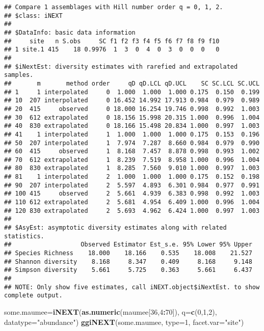 \documentclass[]{article}
\newenvironment{Shaded}{\begin{snugshade}}{\end{snugshade}}
\newcommand{\KeywordTok}[1]{\textcolor[rgb]{0.13,0.29,0.53}{\textbf{#1}}}
\newcommand{\DataTypeTok}[1]{\textcolor[rgb]{0.13,0.29,0.53}{#1}}
\newcommand{\DecValTok}[1]{\textcolor[rgb]{0.00,0.00,0.81}{#1}}
\newcommand{\StringTok}[1]{\textcolor[rgb]{0.31,0.60,0.02}{#1}}
\newcommand{\OperatorTok}[1]{\textcolor[rgb]{0.81,0.36,0.00}{\textbf{#1}}}
\newcommand{\NormalTok}[1]{#1}
\begin{document}
\begin{verbatim}
## Compare 1 assemblages with Hill number order q = 0, 1, 2.
## $class: iNEXT
## 
## $DataInfo: basic data information
##     site   n S.obs     SC f1 f2 f3 f4 f5 f6 f7 f8 f9 f10
## 1 site.1 415    18 0.9976  1  3  0  4  0  3  0  0  0   0
## 
## $iNextEst: diversity estimates with rarefied and extrapolated samples.
##       m       method order     qD qD.LCL qD.UCL    SC SC.LCL SC.UCL
## 1     1 interpolated     0  1.000  1.000  1.000 0.175  0.150  0.199
## 10  207 interpolated     0 16.452 14.992 17.913 0.984  0.979  0.989
## 20  415     observed     0 18.000 16.254 19.746 0.998  0.992  1.003
## 30  612 extrapolated     0 18.156 15.998 20.315 1.000  0.996  1.004
## 40  830 extrapolated     0 18.166 15.498 20.834 1.000  0.997  1.003
## 41    1 interpolated     1  1.000  1.000  1.000 0.175  0.153  0.196
## 50  207 interpolated     1  7.974  7.287  8.660 0.984  0.979  0.990
## 60  415     observed     1  8.168  7.457  8.878 0.998  0.993  1.002
## 70  612 extrapolated     1  8.239  7.519  8.958 1.000  0.996  1.004
## 80  830 extrapolated     1  8.285  7.560  9.010 1.000  0.997  1.003
## 81    1 interpolated     2  1.000  1.000  1.000 0.175  0.152  0.198
## 90  207 interpolated     2  5.597  4.893  6.301 0.984  0.977  0.991
## 100 415     observed     2  5.661  4.939  6.383 0.998  0.992  1.003
## 110 612 extrapolated     2  5.681  4.954  6.409 1.000  0.996  1.004
## 120 830 extrapolated     2  5.693  4.962  6.424 1.000  0.997  1.003
## 
## $AsyEst: asymptotic diversity estimates along with related statistics.
##                   Observed Estimator Est_s.e. 95% Lower 95% Upper
## Species Richness    18.000    18.166    0.535    18.008    21.527
## Shannon diversity    8.168     8.347    0.409     8.168     9.148
## Simpson diversity    5.661     5.725    0.363     5.661     6.437
## 
## NOTE: Only show five estimates, call iNEXT.object$iNextEst. to show complete output.
\end{verbatim}

\begin{Shaded}
\begin{Highlighting}[]
\NormalTok{some.maumee=}\KeywordTok{iNEXT}\NormalTok{(}\KeywordTok{as.numeric}\NormalTok{(maumee[}\DecValTok{36}\NormalTok{,}\DecValTok{4}\OperatorTok{:}\DecValTok{70}\NormalTok{]), }\DataTypeTok{q=}\KeywordTok{c}\NormalTok{(}\DecValTok{0}\NormalTok{,}\DecValTok{1}\NormalTok{,}\DecValTok{2}\NormalTok{), }\DataTypeTok{datatype=}\StringTok{"abundance"}\NormalTok{)}
\KeywordTok{ggiNEXT}\NormalTok{(some.maumee, }\DataTypeTok{type=}\DecValTok{1}\NormalTok{, }\DataTypeTok{facet.var=}\StringTok{"site"}\NormalTok{)}
\end{Highlighting}
\end{Shaded}
\end{document}
